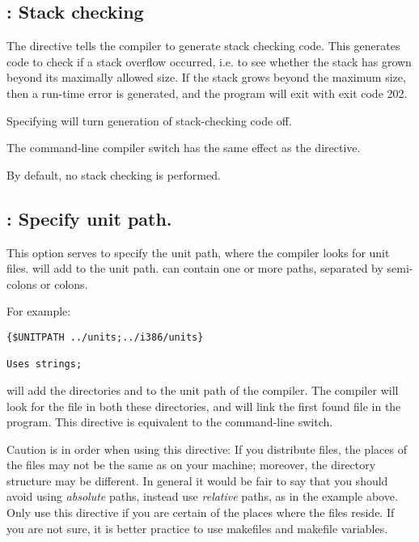 \subsection{ : Stack checking}

The  directive tells the compiler to generate stack checking
code. This generates code to check if a stack overflow occurred, i.e. to see
whether the stack has grown beyond its maximally allowed size. If the stack
grows beyond the maximum size, then a run-time error is generated, and the
program will exit with exit code 202.

Specifying  will turn generation of stack-checking code off.

The command-line compiler switch  has the same effect as the
 directive.

By default, no stack checking is performed.

\subsection{ : Specify unit path.}

This option serves to specify the unit path, where the compiler looks for
unit files.  will add  to the unit
path.  can contain one or more paths, separated by semi-colons or
colons.

For example:
\begin{verbatim}
{$UNITPATH ../units;../i386/units}

Uses strings;
\end{verbatim}

will add the directories  and  to the unit
path of the compiler. The compiler will look for the file 
in both these directories, and will link the first found file in the
program. This directive is equivalent to the  command-line switch.

Caution is in order when using this directive: If you distribute files, the
places of the files may not be the same as on your machine; moreover, the
directory structure may be different. In general it would be fair to say
that you should avoid using {\em absolute} paths, instead use {\em relative}
paths, as in the example above. Only use this directive if you are certain
of the places where the files reside. If you are not sure, it is better
practice to use makefiles and makefile variables.

